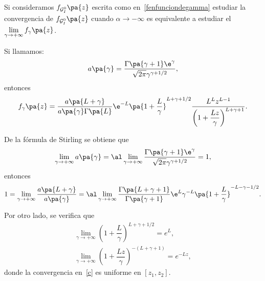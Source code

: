 \begin{dem}
Si consideramos $f_{\mathcal{G}_I^0}\pa{z}$ escrita como en~\eqref{fenfunciondegamma} estudiar la convergencia de $f_{\mathcal{G}_I^0}\pa{z}$ cuando $\alpha\to -\infty$ es equivalente a estudiar el $\lim\limits_{\gamma\to+\infty} f_{\gamma}\pa{z}$. 
		
Si llamamos:
	\begin{align*}
		a\pa{\gamma} &= \frac{\Gamma\pa{\gamma+1}\e^{\gamma}}{\sqrt{2\pi}\gamma^{\gamma+1/2}},\\
	\end{align*}
entonces 
\begin{align}
\label{GIOfunciongamma}
f_{\gamma}\pa{z} = \frac{a\pa{L+\gamma}}{a\pa{\gamma}\Gamma\pa{L}}\e^{-L}\pa{1+\frac{L}{\gamma}}^{L+\gamma+1/2} \dfrac{L^L z^{L-1}}{\left(1+\dfrac{L z}{\gamma}\right)^{L+\gamma +1}}.
\end{align}


De la fórmula de Stirling se obtiene que
	\begin{align*}
	\lim_{\gamma\to+\infty} a\pa{\gamma} = 
	\al \lim_{\gamma\to+\infty}\frac{\Gamma\pa{\gamma+1}\e^{\gamma}}{\sqrt{2\pi}\gamma^{\gamma+1/2}} = 1,
	\end{align*}
entonces
	\begin{align*}
	1=\lim_{\gamma\to+\infty} \frac{a\pa{L+\gamma}}{a\pa{\gamma}} = 
	\al \lim_{\gamma\to+\infty}\frac{\Gamma\pa{L+\gamma+1}}{\Gamma\pa{\gamma+1}}
	\e^{L}\gamma^{-L}\pa{1+\frac{L}{\gamma}}^{-L-\gamma-1/2}.
	\end{align*}

	Por otro lado, se verifica que
	\begin{align}
	\label{b}
	\lim_{\gamma\to+\infty} \left(1+\dfrac{L}{\gamma}\right)^{L+\gamma +1/2}=e^L,\\
	\label{c}
	\lim_{\gamma\to+\infty} \left(1+\dfrac{L z}{\gamma}\right)^{-(L+\gamma +1)}=e^{-L z} ,
	\end{align}
	donde la convergencia en~\eqref{c} es uniforme en $[z_{1},z_{2}]$.
	

\end{dem}
